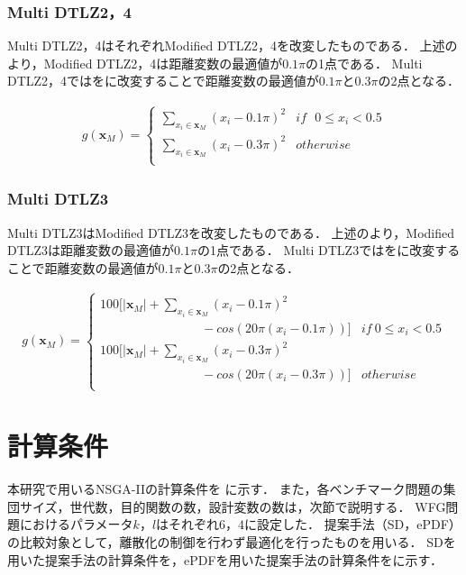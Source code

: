 \documentclass[../main/main]{subfiles}
\begin{document}
\subsubsection{Multi DTLZ2，4}
Multi DTLZ2，4はそれぞれModified DTLZ2，4を改変したものである．
上述のより，Modified DTLZ2，4は距離変数の最適値が$0.1\pi$の1点である．
Multi DTLZ2，4ではをに改変することで距離変数の最適値が$0.1\pi$と$0.3\pi$の2点となる．

\begin{eqnarray}
g(\bm x_M) = 
\left\{
\begin{array}{rl}
\sum_{x_i \in \bm x_M} (x_i - 0.1 \pi)^2 & if  \ \ \  0 \leq x_i < 0.5\\
\sum_{x_i \in \bm x_M} (x_i - 0.3 \pi)^2 & otherwise \\
\end{array}
\right.
\label{gx_multi2}
\end{eqnarray}


\subsubsection{Multi DTLZ3}
Multi DTLZ3はModified DTLZ3を改変したものである．
上述のより，Modified DTLZ3は距離変数の最適値が$0.1\pi$の1点である．
Multi DTLZ3ではをに改変することで距離変数の最適値が$0.1\pi$と$0.3\pi$の2点となる．

\begin{eqnarray}
g(\bm x_M) = 
\left\{
\begin{array}{ll}
100[|\bm x_M| + \sum_{x_i \in \bm x_M} (x_i - 0.1\pi)^2 &\\
\qquad \qquad \qquad \qquad - cos(20 \pi (x_i - 0.1 \pi ))] & if  \  0 \leq x_i < 0.5 \\
100[|\bm x_M| + \sum_{x_i \in \bm x_M} (x_i - 0.3\pi)^2 &\\
\qquad \qquad \qquad \qquad - cos(20 \pi (x_i - 0.3 \pi ))] & otherwise \\
\end{array}
\right.
\label{gx_multi3}
\end{eqnarray}

\newpage
\section{計算条件}
\quad 本研究で用いるNSGA-IIの計算条件を  に示す．
また，各ベンチマーク問題の集団サイズ，世代数，目的関数の数，設計変数の数は，次節で説明する．
WFG問題におけるパラメータ$k$，$l$はそれぞれ$6$，$4$に設定した．
提案手法（SD，ePDF）の比較対象として，離散化の制御を行わず最適化を行ったものを用いる．
SDを用いた提案手法の計算条件を，ePDFを用いた提案手法の計算条件をに示す．
\end{document}
